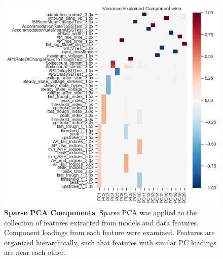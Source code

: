 \begin{figure}    
    \begin{center}
    \includegraphics[scale=0.75]{figures/cortical_model_data_agreement_54_1.png}
    \caption[Sparse PCA Components]{\textbf{Sparse PCA Components}. Sparse PCA was applied to the collection of features extracted from models and data features.
    Component loadings from each feature were examined.
    Features are organized hierarchically, such that features with similar PC loadings are near each other.}
    \end{center}
    \label{fig:spca-heatmap}
\end{figure}    

